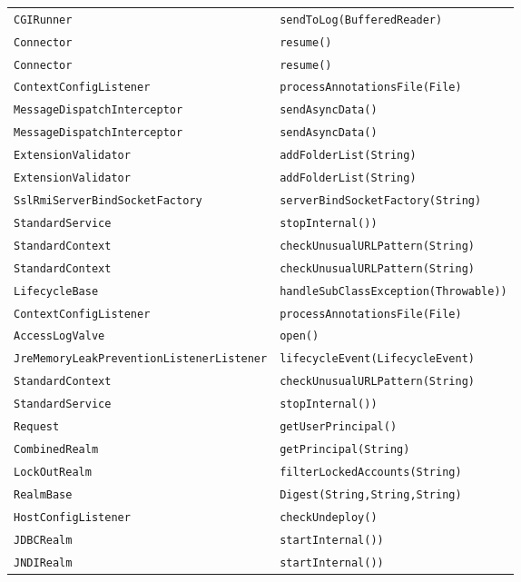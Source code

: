 \begin{center}
\begin{longtable}{ll}
\lstinline/CGIRunner/&{\lstinline/sendToLog(BufferedReader)/}\\
\lstinline/Connector/&{\lstinline/resume()/}\\
\lstinline/Connector/&{\lstinline/resume()/}\\
\lstinline/ContextConfigListener/&{\lstinline/processAnnotationsFile(File)/}\\
\lstinline/MessageDispatchInterceptor/&{\lstinline/sendAsyncData()/}\\
\lstinline/MessageDispatchInterceptor/&{\lstinline/sendAsyncData()/}\\
\lstinline/ExtensionValidator/&{\lstinline/addFolderList(String)/}\\
\lstinline/ExtensionValidator/&{\lstinline/addFolderList(String)/}\\
\lstinline/SslRmiServerBindSocketFactory/&{\lstinline/serverBindSocketFactory(String)/}\\
\lstinline/StandardService/&{\lstinline/stopInternal())/}\\
\lstinline/StandardContext/&{\lstinline/checkUnusualURLPattern(String)/}\\
\lstinline/StandardContext/&{\lstinline/checkUnusualURLPattern(String)/}\\
\lstinline/LifecycleBase/&{\lstinline/handleSubClassException(Throwable))/}\\
\lstinline/ContextConfigListener/&{\lstinline/processAnnotationsFile(File)/}\\
\lstinline/AccessLogValve/&{\lstinline/open()/}\\
\lstinline/JreMemoryLeakPreventionListenerListener/&{\lstinline/lifecycleEvent(LifecycleEvent)/}\\
\lstinline/StandardContext/&{\lstinline/checkUnusualURLPattern(String)/}\\
\lstinline/StandardService/&{\lstinline/stopInternal())/}\\
\lstinline/Request/&{\lstinline/getUserPrincipal()/}\\
\lstinline/CombinedRealm/&{\lstinline/getPrincipal(String)/}\\
\lstinline/LockOutRealm/&{\lstinline/filterLockedAccounts(String)/}\\
\lstinline/RealmBase/&{\lstinline/Digest(String,String,String)/}\\
\lstinline/HostConfigListener/&{\lstinline/checkUndeploy()/}\\
\lstinline/JDBCRealm/&{\lstinline/startInternal())/}\\
\lstinline/JNDIRealm/&{\lstinline/startInternal())/}\\

\end{longtable}
\end{center}
